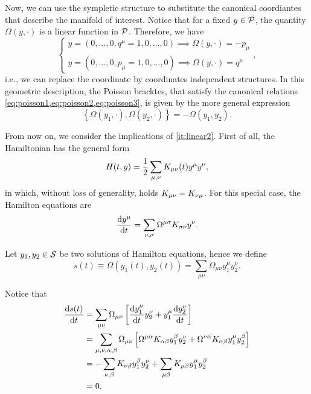 Now, we can use the sympletic structure to substitute the canonical coordiantes that describe the manifold of interest. Notice that for a fixed \(y\in{\mathcal{P}}\), the quantity \(\Omega(y,\cdot)\) is a linear function in \({\mathcal{P}}\). Therefore, we have
\begin{equation}
    \begin{cases}
        y=(0,\dots,0,q^{\mu}=1,0,\dots,0)\implies\Omega(y,\cdot)=-p_{\mu}\\
        y=(0,\dots,0,p_{\mu}=1,0,\dots,0)\implies\Omega(y,\cdot)=q^{\mu}
    \end{cases},
\end{equation}
i.e., we can replace the coordinate by coordinates independent structures. In this geometric description, the Poisson bracktes, that satisfy the canonical relations \cref{eq:poisson1,eq:poisson2,eq:poisson3}, is given by the more general expression
\begin{equation}\label{eq:cpbr}
    \left\{\Omega(y_1,\cdot),\Omega(y_2,\cdot)\right\}=-\Omega(y_1,y_2).
\end{equation}

From now on, we consider the implications of \cref{it:linear2}. First of all, the Hamiltonian has the general form
\begin{equation}
    H(t,y)=\frac{1}{2}\sum_{\mu,\nu}K_{{\mu\nu}}(t)y^\mu y^\nu,
\end{equation}
in which, without loss of generality, holds \(K_{{\mu\nu}}=K_{\nu\mu}\). For this special case, the Hamilton equations are
\begin{equation}
    \diff{y^\mu}{t}=\sum_{\nu,\sigma}\Omega^{\mu\sig}K_{\sig\nu}y^\nu.
\end{equation}

Let \(y_1,y_2\in{\mathcal{S}}\) be two solutions of Hamilton equations, hence we define
\begin{equation}
     s(t)\equiv\Omega(y_1(t),y_2(t))=\sum_{\mu\nu}\Omega_{\mu\nu}y_1^{\mu}y_2^\nu.
\end{equation}

Notice that
\begin{subequations}
    \begin{align}
        \diff{s(t)}{t}&=\sum_{\mu\nu}\Omega_{\mu\nu}\left[\diff{y_1^\mu}{t}y_2^{\nu}+y_1^{\mu}\diff{y_2^\nu}{t}\right]\\
        &=\sum_{\mu,\nu,\alpha,\beta}\Omega_{\mu\nu}\left[\Omega^{\mu\alpha}K_{\alpha\beta}y_1^\beta y_2^\nu+\Omega^{\nu\alpha}K_{\alpha\beta}y_1^{\mu}y_2^{\beta}\right]\\
        &=-\sum_{\nu,\beta}K_{\nu\beta}y_1^{\beta}y_2^{\nu}+\sum_{\mu\beta}K_{\mu\beta}y_1^{\mu}y_2^{\beta}\\
        &=0.
    \end{align}
\end{subequations}

